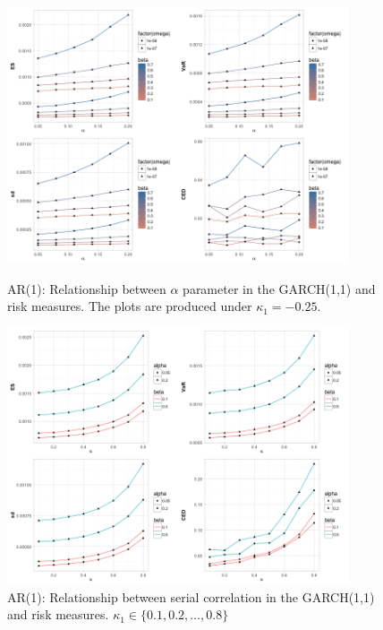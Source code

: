 \documentclass[11pt]{article}
\begin{document}
\begin{figure}[H]
  \centering
  \begin{minipage}[b]{0.48\textwidth}
  \includegraphics[width = 0.9\textwidth]{../figures/simulation_garch/garch_AR1_risk_measures_neg_alpha.png}
\caption{AR(1): Relationship between $\alpha$ parameter in the GARCH(1,1) and risk measures. The plots are produced under $\kappa_1 = -0.25$.}

\label{fig:garch_rm_alpha1}
  \end{minipage}
  \hfill
  \begin{minipage}[b]{0.48\textwidth}
   \includegraphics[width = 0.9\textwidth]{../figures/simulation_garch/garch_AR1_risk_measures_ar1}
\caption{AR(1): Relationship between serial correlation in the GARCH(1,1) and risk measures. $\kappa_1 \in \{0.1,0.2, \dots, 0.8 \}$}
\label{fig:garch_rm_coef1}
  \end{minipage}
\end{figure}
\end{document}
